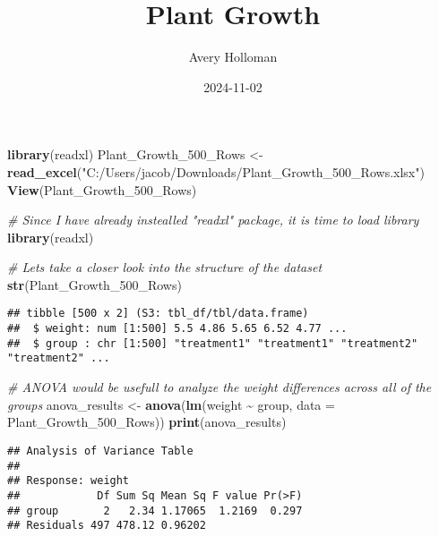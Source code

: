 \documentclass[
]{article}
\title{Plant Growth}
\author{Avery Holloman}
\date{2024-11-02}
\newenvironment{Shaded}{\begin{snugshade}}{\end{snugshade}}
\newcommand{\AttributeTok}[1]{\textcolor[rgb]{0.13,0.29,0.53}{#1}}
\newcommand{\CommentTok}[1]{\textcolor[rgb]{0.56,0.35,0.01}{\textit{#1}}}
\newcommand{\FunctionTok}[1]{\textcolor[rgb]{0.13,0.29,0.53}{\textbf{#1}}}
\newcommand{\NormalTok}[1]{#1}
\newcommand{\OtherTok}[1]{\textcolor[rgb]{0.56,0.35,0.01}{#1}}
\newcommand{\SpecialCharTok}[1]{\textcolor[rgb]{0.81,0.36,0.00}{\textbf{#1}}}
\newcommand{\StringTok}[1]{\textcolor[rgb]{0.31,0.60,0.02}{#1}}
\begin{document}
\maketitle

\begin{Shaded}
\begin{Highlighting}[]
\FunctionTok{library}\NormalTok{(readxl)}
\NormalTok{Plant\_Growth\_500\_Rows }\OtherTok{\textless{}{-}} \FunctionTok{read\_excel}\NormalTok{(}\StringTok{"C:/Users/jacob/Downloads/Plant\_Growth\_500\_Rows.xlsx"}\NormalTok{)}
\FunctionTok{View}\NormalTok{(Plant\_Growth\_500\_Rows)}
\end{Highlighting}
\end{Shaded}

\begin{Shaded}
\begin{Highlighting}[]
\CommentTok{\# Since I have already instealled "readxl" package, it is time to load library}
\FunctionTok{library}\NormalTok{(readxl)}

\CommentTok{\# Lets take a closer look into the structure of the dataset}
\FunctionTok{str}\NormalTok{(Plant\_Growth\_500\_Rows)}
\end{Highlighting}
\end{Shaded}

\begin{verbatim}
## tibble [500 x 2] (S3: tbl_df/tbl/data.frame)
##  $ weight: num [1:500] 5.5 4.86 5.65 6.52 4.77 ...
##  $ group : chr [1:500] "treatment1" "treatment1" "treatment2" "treatment2" ...
\end{verbatim}

\begin{Shaded}
\begin{Highlighting}[]
\CommentTok{\# ANOVA would be usefull to analyze the weight differences across all of the groups}
\NormalTok{anova\_results }\OtherTok{\textless{}{-}} \FunctionTok{anova}\NormalTok{(}\FunctionTok{lm}\NormalTok{(weight }\SpecialCharTok{\textasciitilde{}}\NormalTok{ group, }\AttributeTok{data =}\NormalTok{ Plant\_Growth\_500\_Rows))}
\FunctionTok{print}\NormalTok{(anova\_results)}
\end{Highlighting}
\end{Shaded}

\begin{verbatim}
## Analysis of Variance Table
## 
## Response: weight
##            Df Sum Sq Mean Sq F value Pr(>F)
## group       2   2.34 1.17065  1.2169  0.297
## Residuals 497 478.12 0.96202
\end{verbatim}
\end{document}
